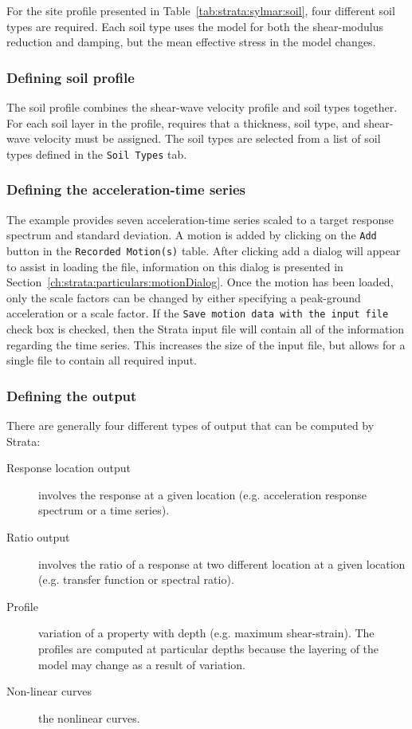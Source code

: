 \documentclass[12pt,oneside]{book}
\begin{document}
For the site profile presented in Table~\ref{tab:strata:sylmar:soil}, four different soil types are
required.  Each soil type uses the \citet{darendeli:01} model for both the shear-modulus reduction
and damping, but the mean effective stress in the model changes.

\subsubsection{Defining soil profile}
The soil profile combines the shear-wave velocity profile and soil types together.  For each soil
layer in the profile, requires that a thickness, soil type, and shear-wave velocity must be
assigned.  The soil types are selected from a list of soil types defined in the \texttt{Soil Types}
tab.

\subsubsection{Defining the acceleration-time series}
The example provides seven acceleration-time series scaled to a target response spectrum and
standard deviation.  A motion is added by clicking on the \texttt{Add} button in the
\texttt{Recorded Motion(s)} table.  After clicking add a dialog will appear to assist in loading the
file, information on this dialog is presented in Section~\ref{ch:strata:particulars:motionDialog}.
Once the motion has been loaded, only the scale factors can be changed by either specifying a
peak-ground acceleration or a scale factor.  If the \texttt{Save motion data with the input file}
check box is checked, then the Strata input file will contain all of the information regarding the
time series.  This increases the size of the input file, but allows for a single file to contain all
required input.

\subsubsection{Defining the output}
There are generally four different types of output that can be computed by Strata:
\begin{description}
    \item[Response location output] involves the response at a given location (e.g. acceleration
        response spectrum or a time series).
    \item[Ratio output] involves the ratio of a response at two different location at a given location
        (e.g. transfer function or spectral ratio).
    \item[Profile] variation of a property with depth (e.g. maximum shear-strain).  The profiles are
        computed at particular depths because the layering of the model may change as a result of variation. 
    \item[Non-linear curves] the nonlinear curves.
\end{description}
\end{document}

